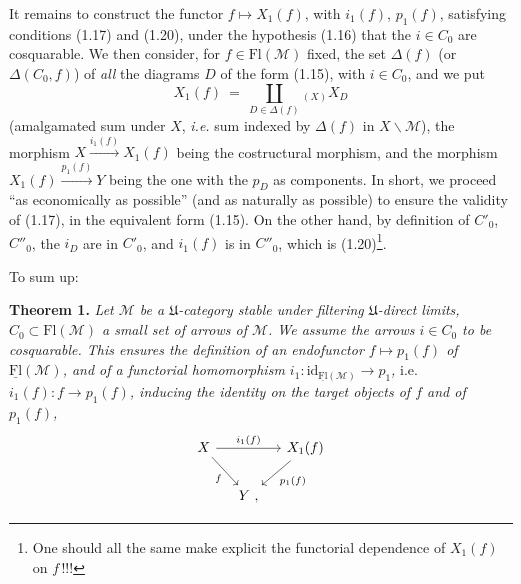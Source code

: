 \documentclass[11pt]{article}
\newcommand{\msp}[1]{\marginpar{\footnotesize [#1]}}
\newcommand{\cM}{\mathcal{M}}
\newcommand{\Flu}{\underline{\mathrm{Fl}}}
\newcommand{\Fl}{\mathrm{Fl}}
\newcommand{\fU}{\mathfrak{U}}
\begin{document}
It remains to construct the functor $f \longmapsto X_1(f)$, with $i_1(f)$, $p_1(f)$, satisfying conditions (1.17) and (1.20), under the hypothesis (1.16) that the $i \in C_0$ are cosquarable. We then consider, for $f \in \Fl(\cM)$ fixed, the set $\Delta(f)$ (or $\Delta(C_0, f)$) of \textit{all} the diagrams $D$ of the form (1.15), with $i \in C_0$, and we put
\[
X_1(f) \ = \ \coprod_{D \in \Delta(f)}{}_{(X)} X_D
\tag*{(1.23)}
\]
(amalgamated sum under $X$, \textit{i.e.} sum indexed
\msp{page 10}
by $\Delta(f)$ in $X\backslash\cM$), the morphism $X \xrightarrow{i_1(f)} X_1(f)$ being the costructural morphism, and the morphism $X_1(f) \xrightarrow{p_1(f)} Y$ being the one with the $p_D$ as components. In short, we proceed ``as economically as possible'' (and as naturally as possible) to ensure the validity of (1.17), in the equivalent form (1.15). On the other hand, by definition of $C'_0$, $C''_0$, the $i_D$ are in $C'_0$, and $i_1(f)$ is in $C''_0$, which is (1.20)\footnote{One should all the same make explicit the functorial dependence of $X_1(f)$ on $f$\,!!!}.

To sum up:

\textbf{Theorem 1.} \textit{Let $\cM$ be a $\fU$-category stable under filtering $\fU$-direct limits, $C_0 \subset \Fl(\cM)$ a small set of arrows of $\cM$. We assume the arrows $i \in C_0$ to be cosquarable. This ensures the definition of an endofunctor $f \longmapsto p_1(f)$ of $\Flu(\cM)$, and of a functorial homomorphism $i_1 : \mathrm{id}_{\Flu(\cM)} \longrightarrow p_1$,} i.e. \textit{$i_1(f) : f \longrightarrow p_1(f)$, inducing the identity on the target objects of $f$ and of $p_1(f)$,}
\[
\begin{tikzcd}[column sep=small]
X \arrow[rr, "i_1(f)"] \arrow[dr, "f"'] & & X_1(f) \arrow[dl, "p_1(f)"] \\
 & Y \ , &
\end{tikzcd}
\]
\end{document}
